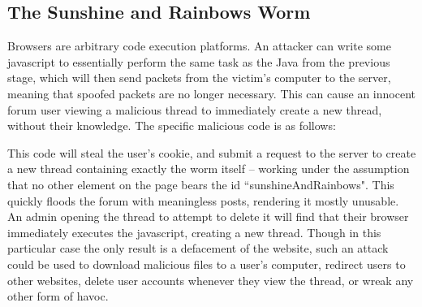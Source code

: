 
\subsection{The Sunshine and Rainbows Worm}

Browsers are arbitrary code execution platforms. An attacker can write some javascript to essentially perform the same
task as the Java from the previous stage, which will then send packets from the victim's computer to the server, meaning
that spoofed packets are no longer necessary. This can cause an innocent forum user viewing a malicious thread to
immediately create a new thread, without their knowledge. The specific malicious code is as follows:


This code will steal the user's cookie, and submit a request to the server to create a new thread containing exactly the
worm itself -- working under the assumption that no other element on the page bears the id ``sunshineAndRainbows". This
quickly floods the forum with meaningless posts, rendering it mostly unusable. An admin opening the thread to attempt to
delete it will find that their browser immediately executes the javascript, creating a new thread. Though in this
particular case the only result is a defacement of the website, such an attack could be used to download malicious files
to a user's computer, redirect users to other websites, delete user accounts whenever they view the thread, or wreak any
other form of havoc.

